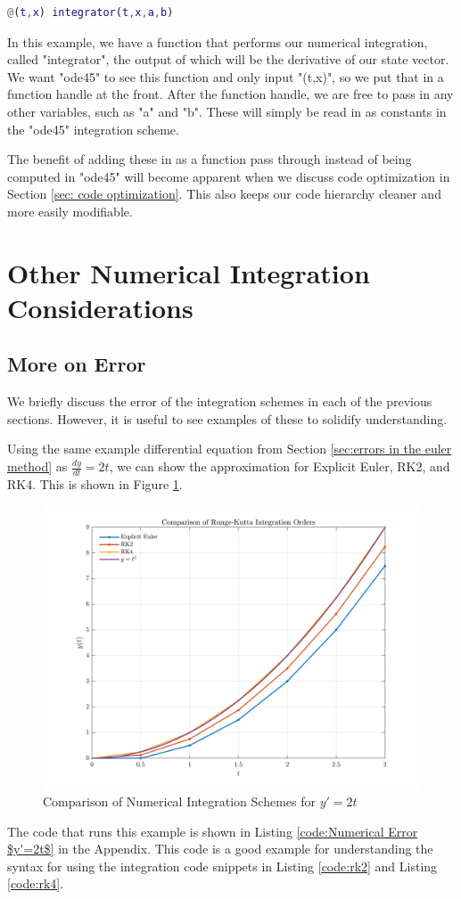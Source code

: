 \documentclass[12pt]{report}
\begin{document}
\begin{lstlisting}[language=Matlab]
@(t,x) integrator(t,x,a,b)
\end{lstlisting}
In this example, we have a function that performs our numerical integration, called "integrator", the output of which will be the derivative of our state vector. We want "ode45" to see this function and only input "(t,x)", so we put that in a function handle at the front. After the function handle, we are free to pass in any other variables, such as "a" and "b". These will simply be read in as constants in the "ode45" integration scheme.

The benefit of adding these in as a function pass through instead of being computed in "ode45" will become apparent when we discuss code optimization in Section \ref{sec: code optimization}. This also keeps our code hierarchy cleaner and more easily modifiable.

\section{Other Numerical Integration Considerations}\label{sec:other numerical ints}
\subsection{More on Error}
We briefly discuss the error of the integration schemes in each of the previous sections. However, it is useful to see examples of these to solidify understanding. 

Using the same example differential equation from Section \ref{sec:errors in the euler method} as $\frac{dy}{dt}=2t$, we can show the approximation for Explicit Euler, RK2, and RK4. This is shown in Figure \ref{fig:Numerical Comparison}.
\begin{figure}[ht]
    \centering
    \includegraphics[width=\linewidth]{6DoF Explanation Scripts/Numerical Integrator Comparison Figure.png}
    \caption{Comparison of Numerical Integration Schemes for $y'=2t$}
    \label{fig:Numerical Comparison}
\end{figure}
The code that runs this example is shown in Listing \ref{code:Numerical Error $y'=2t$} in the Appendix. This code is a good example for understanding the syntax for using the integration code snippets in Listing \ref{code:rk2} and Listing \ref{code:rk4}.
\end{document}
